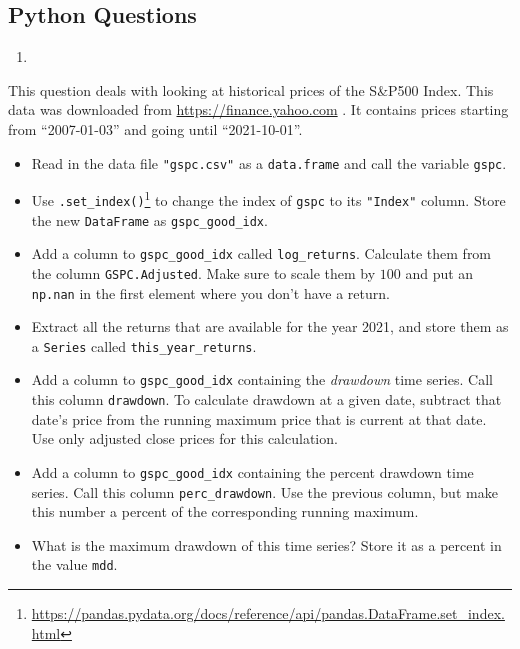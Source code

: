 \documentclass[
  12pt,
  krantz2]{krantz}
\providecommand{\tightlist}{%
  \setlength{\itemsep}{0pt}\setlength{\parskip}{0pt}}
\renewcommand{\href}[2]{#2\footnote{\url{#1}}}
\begin{document}
\hypertarget{python-questions-6}{%
\subsection{Python Questions}\label{python-questions-6}}

\begin{enumerate}
\def\labelenumi{\arabic{enumi}.}
\tightlist
\item
\end{enumerate}

This question deals with looking at historical prices of the S\&P500 Index. This data was downloaded from \url{https://finance.yahoo.com} \citep{gspc_data}. It contains prices starting from ``2007-01-03'' and going until ``2021-10-01''.

\begin{itemize}
\tightlist
\item
  Read in the data file \texttt{"gspc.csv"} as a \texttt{data.frame} and call the variable \texttt{gspc}.
\item
  Use \href{https://pandas.pydata.org/docs/reference/api/pandas.DataFrame.set_index.html}{\texttt{.set\_index()}} to change the index of \texttt{gspc} to its \texttt{"Index"} column. Store the new \texttt{DataFrame} as \texttt{gspc\_good\_idx}.
\item
  Add a column to \texttt{gspc\_good\_idx} called \texttt{log\_returns}. Calculate them from the column \texttt{GSPC.Adjusted}. Make sure to scale them by \(100\) and put an \texttt{np.nan} in the first element where you don't have a return.
\item
  Extract all the returns that are available for the year 2021, and store them as a \texttt{Series} called \texttt{this\_year\_returns}.
\item
  Add a column to \texttt{gspc\_good\_idx} containing the \emph{drawdown} time series. Call this column \texttt{drawdown}. To calculate drawdown at a given date, subtract that date's price from the running maximum price that is current at that date. Use only adjusted close prices for this calculation.\\
\item
  Add a column to \texttt{gspc\_good\_idx} containing the percent drawdown time series. Call this column \texttt{perc\_drawdown}. Use the previous column, but make this number a percent of the corresponding running maximum.
\item
  What is the maximum drawdown of this time series? Store it as a percent in the value \texttt{mdd}.
\end{itemize}
\end{document}
